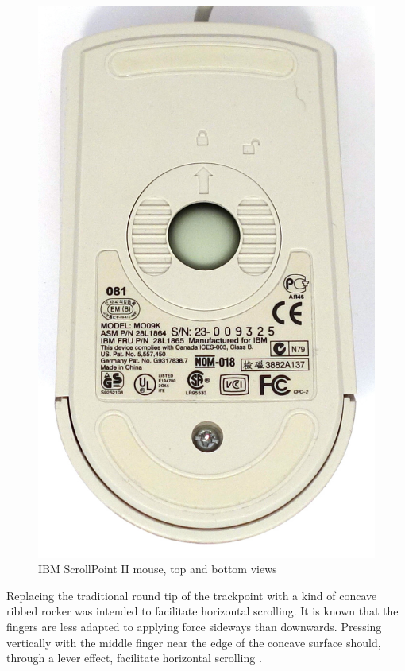 \documentclass[11pt, a4paper]{article}
\begin{document}
\begin{figure}[h]
    \includegraphics[scale=0.75]{2000_ibm_scrollpoint_ii_mouse/bottom_30.jpg}
    \caption{IBM ScrollPoint II mouse, top and bottom views}
    \label{fig:IBMScrollPointIITopBottom}
\end{figure}

Replacing the traditional round tip of the trackpoint with a kind of concave ribbed rocker was intended to facilitate horizontal scrolling. It is known that the fingers are less adapted to applying force sideways than downwards. Pressing vertically with the middle finger near the edge of the concave surface should, through a lever effect, facilitate horizontal scrolling \cite{buxtonG2}.
\end{document}
